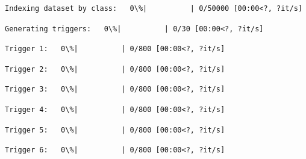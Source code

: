 \documentclass[11pt]{article}
\begin{document}
    
    \begin{Verbatim}[commandchars=\\\{\}]
Indexing dataset by class:   0\%|          | 0/50000 [00:00<?, ?it/s]
    \end{Verbatim}

    
    
    \begin{Verbatim}[commandchars=\\\{\}]
Generating triggers:   0\%|          | 0/30 [00:00<?, ?it/s]
    \end{Verbatim}

    
    
    \begin{Verbatim}[commandchars=\\\{\}]
Trigger 1:   0\%|          | 0/800 [00:00<?, ?it/s]
    \end{Verbatim}

    
    
    \begin{Verbatim}[commandchars=\\\{\}]
Trigger 2:   0\%|          | 0/800 [00:00<?, ?it/s]
    \end{Verbatim}

    
    
    \begin{Verbatim}[commandchars=\\\{\}]
Trigger 3:   0\%|          | 0/800 [00:00<?, ?it/s]
    \end{Verbatim}

    
    
    \begin{Verbatim}[commandchars=\\\{\}]
Trigger 4:   0\%|          | 0/800 [00:00<?, ?it/s]
    \end{Verbatim}

    
    
    \begin{Verbatim}[commandchars=\\\{\}]
Trigger 5:   0\%|          | 0/800 [00:00<?, ?it/s]
    \end{Verbatim}

    
    
    \begin{Verbatim}[commandchars=\\\{\}]
Trigger 6:   0\%|          | 0/800 [00:00<?, ?it/s]
    \end{Verbatim}

    
    
\end{document}

